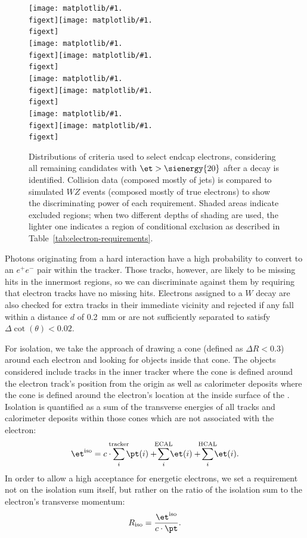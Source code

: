 \begin{figure}[p]
  \centering
  \newcommand{\mywidth}{0.47\textwidth}
  \newcommand{\mygraph}[1]{\texttt{[image: matplotlib/\#1.\\figext]}}
  \mygraph{lepcuts100/he_pt}\hfill\mygraph{lepcuts10/he_iso}\\
  \mygraph{lepcuts100/he_detain}\hfill\mygraph{lepcuts100/he_dphiin}\\
  \mygraph{lepcuts100/he_nmiss}\hfill\mygraph{lepcuts100/he_sieie}\\
  \mygraph{lepcuts100/he_dist}\hfill\mygraph{lepcuts100/he_dcot}\\
  \caption[Distributions of criteria used to select endcap electrons]{Distributions of criteria used to select endcap electrons, considering all remaining candidates with $\et > \sienergy{20}$ after a \ztoll{} decay is identified.  Collision data (composed mostly of jets) is compared to simulated $WZ$ events (composed mostly of true electrons) to show the discriminating power of each requirement.  Shaded areas indicate excluded regions; when two different depths of shading are used, the lighter one indicates a region of conditional exclusion as described in Table~\ref{tab:electron-requirements}.}
  \label{fig:electron-cuts-he}
\end{figure}

Photons originating from a hard interaction have a high probability to convert to an $e^+e^-$ pair within the tracker.  Those tracks, however, are likely to be missing hits in the innermost regions, so we can discriminate against them by requiring that electron tracks have no missing hits.  Electrons assigned to a $W$ decay are also checked for extra tracks in their immediate vicinity and rejected if any fall within a distance $d$ of \SI{0.2}{mm} or are not sufficiently separated to satisfy $\Delta\cot(\theta) < 0.02$.

For isolation, we take the approach of drawing a cone (defined as $\Delta R < 0.3$) around each electron and looking for objects inside that cone.  The objects considered include tracks in the inner tracker where the cone is defined around the electron track's position from the origin as well as calorimeter deposits where the cone is defined around the electron's location at the inside surface of the \ecal.  Isolation is quantified as a sum of the transverse energies of all tracks and calorimeter deposits within those cones which are not associated with the electron:
\begin{equation}
  \label{eq:isolation}
  \et^\text{iso} = c \cdot \!\!\!\sum_i^\text{tracker}\!\!\! \pt(i) + \!\!\!\sum_i^\text{ECAL}\!\!\! \et(i) + \!\!\!\sum_i^\text{HCAL}\!\!\! \et(i).
\end{equation}
In order to allow a high acceptance for energetic electrons, we set a requirement not on the isolation sum itself, but rather on the ratio of the isolation sum to the electron's transverse momentum:
\begin{equation}
  \label{eq:riso}
  R_\text{iso} = \frac{\et^\text{iso}}{c \cdot \pt}.
\end{equation}


